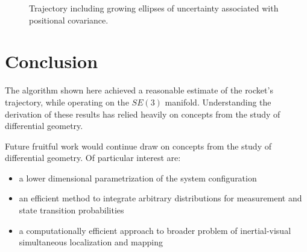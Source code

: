 \documentclass{article}
\begin{document}
\begin{figure}[htbp]%
    \centering
    \caption{Trajectory including growing ellipses of uncertainty associated with positional covariance.}%
    \label{fig:unc_ellipses}
\end{figure}

\section{Conclusion}
The algorithm shown here achieved a reasonable estimate of the rocket's trajectory, while operating on the $SE(3)$ manifold. Understanding the derivation of these results has relied heavily on concepts from the study of differential geometry. 

Future fruitful work would continue draw on concepts from the study of differential geometry. Of particular interest are:
\begin{itemize}
    \item a lower dimensional parametrization of the system configuration
    \item an efficient method to integrate arbitrary distributions for measurement and state transition probabilities
    \item a computationally efficient approach to broader problem of inertial-visual simultaneous localization and mapping
\end{itemize}

\appendix
\newpage
\end{document}
